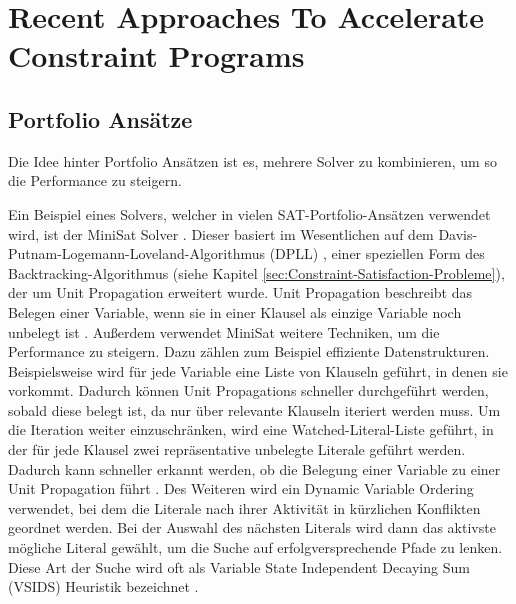 \section{Recent Approaches To Accelerate Constraint Programs}
\label{sec:Recent-Approaches-To-Accelerate-Constraint-Programs}


\subsection{Portfolio Ansätze}
\label{sec:Portfolio-Ansätze}

Die Idee hinter Portfolio Ansätzen ist es, mehrere Solver zu kombinieren, um so
die Performance zu steigern. 


Ein Beispiel eines Solvers, welcher in vielen SAT-Portfolio-Ansätzen verwendet
wird, ist der MiniSat Solver \cite{een04bo}. Dieser basiert im Wesentlichen auf
dem Davis-Putnam-Logemann-Loveland-Algorithmus (DPLL) \cite{davis62jo}, einer
speziellen Form des Backtracking-Algorithmus (siehe Kapitel
\ref{sec:Constraint-Satisfaction-Probleme}), der um Unit Propagation erweitert
wurde. Unit Propagation beschreibt das Belegen einer Variable, wenn sie in einer
Klausel als einzige Variable noch unbelegt ist \cite*[S.89]{rossi06bo}. Außerdem
verwendet MiniSat weitere Techniken, um die Performance zu steigern. Dazu zählen
zum Beispiel effiziente Datenstrukturen. Beispielsweise wird für jede Variable
eine Liste von Klauseln geführt, in denen sie vorkommt. Dadurch können Unit
Propagations schneller durchgeführt werden, sobald diese belegt ist, da nur über
relevante Klauseln iteriert werden muss. Um die Iteration weiter einzuschränken,
wird eine Watched-Literal-Liste geführt, in der für jede Klausel zwei
repräsentative unbelegte Literale geführt werden. Dadurch kann schneller erkannt
werden, ob die Belegung einer Variable zu einer Unit Propagation führt
\cite[505]{een04bo}. Des Weiteren wird ein Dynamic Variable Ordering verwendet,
bei dem die Literale nach ihrer Aktivität in kürzlichen Konflikten geordnet
werden. Bei der Auswahl des nächsten Literals wird dann das aktivste mögliche
Literal gewählt, um die Suche auf erfolgversprechende Pfade zu lenken. Diese Art
der Suche wird oft als Variable State Independent Decaying Sum (VSIDS) Heuristik
bezeichnet \cite[506f]{een04bo}.



